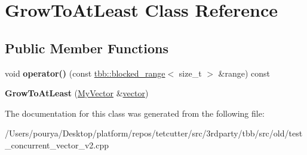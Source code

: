 \hypertarget{classGrowToAtLeast}{}\section{Grow\+To\+At\+Least Class Reference}
\label{classGrowToAtLeast}
\subsection*{Public Member Functions}
\begin{DoxyCompactItemize}
\item 
\hypertarget{classGrowToAtLeast_a99eaf1904f7a11677c78c20d48c04f50}{}void {\bfseries operator()} (const \hyperlink{classtbb_1_1blocked__range}{tbb\+::blocked\+\_\+range}$<$ size\+\_\+t $>$ \&range) const \label{classGrowToAtLeast_a99eaf1904f7a11677c78c20d48c04f50}

\item 
\hypertarget{classGrowToAtLeast_a68c1b3213fef3c504e0a0779e87b3191}{}{\bfseries Grow\+To\+At\+Least} (\hyperlink{classtbb_1_1concurrent__vector}{My\+Vector} \&\hyperlink{structvector}{vector})\label{classGrowToAtLeast_a68c1b3213fef3c504e0a0779e87b3191}

\end{DoxyCompactItemize}


The documentation for this class was generated from the following file\+:\begin{DoxyCompactItemize}
\item 
/\+Users/pourya/\+Desktop/platform/repos/tetcutter/src/3rdparty/tbb/src/old/test\+\_\+concurrent\+\_\+vector\+\_\+v2.\+cpp\end{DoxyCompactItemize}
